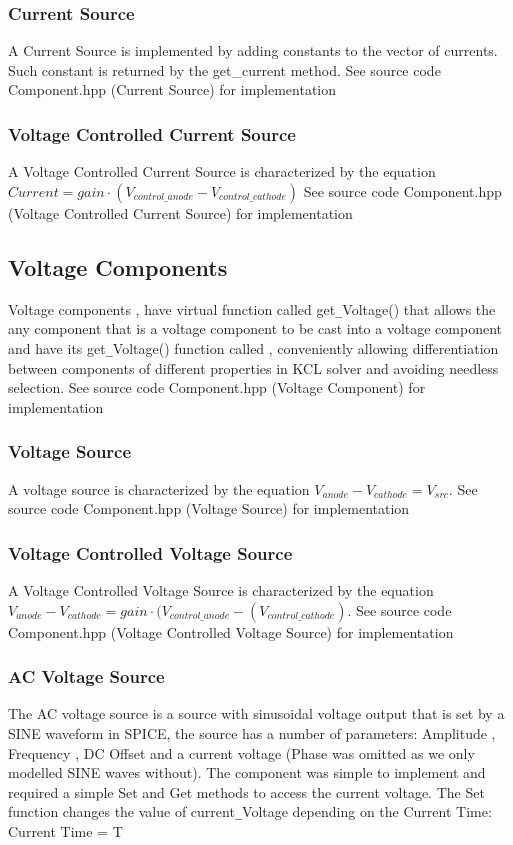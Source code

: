 \documentclass{article}
\begin{document}
\subsubsection{Current Source}
A Current Source is implemented by adding constants to the vector of currents. Such constant is returned by the get\_current method.\bigbreak
See source code Component.hpp (Current Source) for implementation
\subsubsection{Voltage Controlled Current Source}
A Voltage Controlled Current Source is characterized by the equation $ Current = gain\cdot(V_{control\_anode}-V_{control\_cathode})$
\bigbreak
See source code Component.hpp (Voltage Controlled Current Source) for implementation
\newpage
\subsection{Voltage Components}
Voltage components , have virtual function called get\verb|_|Voltage() that allows the any component that is a voltage component to be cast into a voltage component and have its get\verb|_|Voltage() function called , conveniently allowing differentiation between components of different properties in KCL solver and avoiding needless selection.
\bigbreak
See source code Component.hpp (Voltage Component) for implementation

\subsubsection{Voltage Source}
A voltage source is characterized by the equation $V_{anode}-V_{cathode}=V_{src}$. \bigbreak
See source code Component.hpp (Voltage Source) for implementation

\subsubsection{Voltage Controlled Voltage Source}
A Voltage Controlled Voltage Source is characterized by the equation
$V_{anode}-V_{cathode}=gain\cdot(V_{control\_anode}-(V_{control\_cathode})$.
\bigbreak
See source code Component.hpp (Voltage Controlled Voltage Source) for implementation


\subsubsection{AC Voltage Source}
The AC voltage source is a source with sinusoidal voltage output that is set by a SINE waveform in SPICE, the source has a number of parameters: Amplitude , Frequency , DC Offset and a current voltage (Phase was omitted as we only modelled SINE waves without). The component was simple to implement and required a simple Set and Get methods to access the current voltage. 
The Set function changes the value of current\verb|_|Voltage depending on the Current Time: Current Time = T
\medbreak
\end{document}
